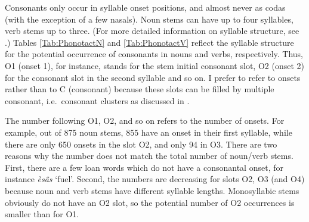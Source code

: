 Consonants only occur in syllable onset positions, and almost never as codas (with the exception of a few nasals). Noun stems can have up to four syllables, verb stems up to three. (For more detailed information on syllable structure, see .) Tables \ref{Tab:PhonotactN} and \ref{Tab:PhonotactV} reflect the syllable structure for the potential occurrence of consonants in nouns and verbs, respectively. Thus, O1 (onset 1), for instance, stands for the stem initial consonant slot, O2 (onset 2) for the consonant slot in the second syllable and so on. I prefer to refer to onsets rather than to C (consonant) because these slots can be filled by multiple consonant, i.e.\ consonant clusters as discussed in .

The number following O1, O2, and so on refers to the number of onsets. For example, out of 875 noun stems, 855 have an onset in their first syllable, while there are only 650 onsets  in the slot O2, and only 94 in O3. There are two reasons why the number does not match the total number of noun/verb stems. First, there are a few loan words which do not have a consonantal onset, for instance {\itshape èsã̂s} `fuel'. Second, the numbers are decreasing for slots O2, O3 (and O4) because noun and verb stems have different syllable lengths. Monosyllabic stems obviously do not have an O2 slot, so the potential number of O2 occurrences is smaller than for O1.


